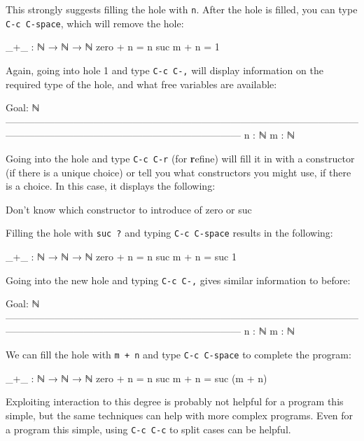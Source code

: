 This strongly suggests filling the hole with \texttt{n}. After the hole
is filled, you can type \texttt{C-c\ C-space}, which will remove the
hole:

\begin{myDisplay}
_+_ : ℕ → ℕ → ℕ
zero + n = n
suc m + n = { }1
\end{myDisplay}

Again, going into hole 1 and type \texttt{C-c\ C-,} will display
information on the required type of the hole, and what free variables
are available:

\begin{myDisplay}
Goal: ℕ
————————————————————————————————————————————————————————————
n : ℕ
m : ℕ
\end{myDisplay}

Going into the hole and type \texttt{C-c\ C-r} (for \textbf{r}efine)
will fill it in with a constructor (if there is a unique choice) or tell
you what constructors you might use, if there is a choice. In this case,
it displays the following:

\begin{myDisplay}
Don't know which constructor to introduce of zero or suc
\end{myDisplay}

Filling the hole with \texttt{suc\ ?} and typing \texttt{C-c\ C-space}
results in the following:

\begin{myDisplay}
_+_ : ℕ → ℕ → ℕ
zero + n = n
suc m + n = suc { }1
\end{myDisplay}

Going into the new hole and typing \texttt{C-c\ C-,} gives similar
information to before:

\begin{myDisplay}
Goal: ℕ
————————————————————————————————————————————————————————————
n : ℕ
m : ℕ
\end{myDisplay}

We can fill the hole with \texttt{m\ +\ n} and type
\texttt{C-c\ C-space} to complete the program:

\begin{myDisplay}
_+_ : ℕ → ℕ → ℕ
zero + n = n
suc m + n = suc (m + n)
\end{myDisplay}

Exploiting interaction to this degree is probably not helpful for a
program this simple, but the same techniques can help with more complex
programs. Even for a program this simple, using \texttt{C-c\ C-c} to
split cases can be helpful.

